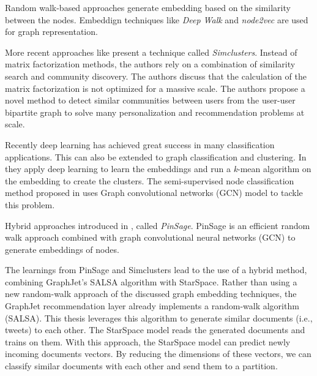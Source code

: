 Random walk-based approaches generate embedding based on the similarity between the nodes. Embeddign techniques like \emph{Deep Walk} \cite{perozziDeepWalkOnlineLearning2014} and \emph{node2vec} \cite{groverNode2vecScalableFeature2016} are used for graph representation.


More recent approaches like \cite{satuluriSimClustersCommunityBasedRepresentations2020a} present a technique called \emph{Simclusters}. Instead of matrix factorization methods, the authors rely on a combination of similarity search and community discovery. The authors discuss that the calculation of the matrix factorization is not optimized for a massive scale. The authors propose a novel method to detect similar communities between users from the user-user bipartite graph to solve many personalization and recommendation problems at scale.


Recently deep learning has achieved great success in many classification applications. This can also be extended to graph classification and clustering. In \cite{tianLearningDeepRepresentations2014} they apply deep learning to learn the embeddings and run a \emph{k}-mean algorithm on the embedding to create the clusters. The semi-supervised node classification method proposed in \cite{kipfSemiSupervisedClassificationGraph2017} uses Graph convolutional networks (GCN) model to tackle this problem. 

Hybrid approaches introduced in \cite{yingGraphConvolutionalNeural2018}, called \emph{PinSage}. PinSage is an efficient random walk approach combined with graph convolutional neural networks (GCN) to generate embeddings of nodes.


The learnings from PinSage and Simclusters lead to the use of a hybrid method, combining GraphJet's SALSA algorithm with StarSpace. Rather than using a new random-walk approach of the discussed graph embedding techniques, the GraphJet recommendation layer already implements a random-walk algorithm (SALSA). This thesis leverages this algorithm to generate similar documents (i.e., tweets) to each other. The StarSpace model reads the generated documents and trains on them. With this approach, the StarSpace model can predict newly incoming documents vectors. By reducing the dimensions of these vectors, we can classify similar documents with each other and send them to a partition. 
